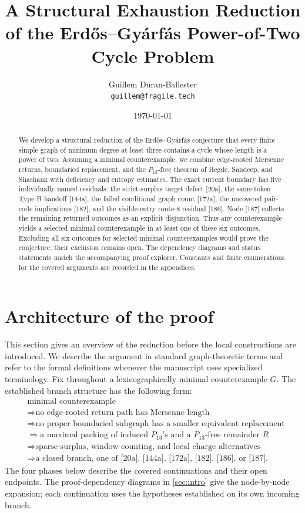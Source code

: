 \documentclass[11pt]{article}
\title{A Structural Exhaustion Reduction of the Erd\H{o}s--Gy\'arf\'as Power-of-Two Cycle Problem}
\author{Guillem Duran-Ballester\\\texttt{guillem@fragile.tech}}
\date{\today}
\begin{document}
\maketitle

\begin{abstract}
We develop a structural reduction of the Erd\H{o}s--Gy\'arf\'as conjecture
that every finite simple graph of minimum degree at least three contains a
cycle whose length is a power of two.  Assuming a minimal counterexample, we
combine edge-rooted Mersenne returns, boundaried replacement, and the
$P_{13}$-free theorem of Hegde, Sandeep, and Shashank with deficiency and
entropy estimates.  The exact current boundary has five individually named
residuals: the strict-surplus target defect [20a], the same-token Type B
handoff [144a], the failed conditional graph count [172a], the uncovered
pair-code implications [182], and the visible-entry route-8 residual [186].
Node [187] collects the remaining returned outcomes as an explicit
disjunction.  Thus any counterexample yields a selected minimal
counterexample in at least one of these six outcomes.  Excluding all six
outcomes for selected minimal counterexamples would prove the conjecture;
their exclusion remains open.
The dependency diagrams and status statements match the accompanying proof
explorer.  Constants and finite enumerations for the covered arguments are
recorded in the appendices.
\end{abstract}

\tableofcontents

\setcounter{section}{-1}
\section{Architecture of the proof}\label{sec:architecture}

This section gives an overview of the reduction before the local
constructions are introduced.  We describe the argument in standard graph-theoretic terms and
refer to the formal definitions whenever the manuscript uses specialized
terminology.  Fix throughout a lexicographically minimal counterexample $G$.
The established branch structure has the following form:
\[
\begin{aligned}
&\text{minimal counterexample}\\
&\Rightarrow \text{no edge-rooted return path has Mersenne length}\\
&\Rightarrow \text{no proper boundaried subgraph has a smaller equivalent replacement}\\
&\Rightarrow \text{a maximal packing of induced }P_{13}\text{'s and a }P_{13}\text{-free remainder }R\\
&\Rightarrow \text{sparse-surplus, window-counting, and local charge alternatives}\\
&\Rightarrow \text{a closed branch, one of [20a], [144a], [172a], [182], [186], or [187].}
\end{aligned}
\]
The four phases below describe the covered continuations and their open
endpoints.  The proof-dependency diagrams in \cref{sec:intro} give the
node-by-node expansion; each continuation uses the hypotheses established
on its own incoming branch.
\end{document}
